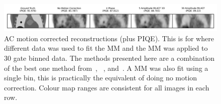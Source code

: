             \begin{figure}
                \centering
                
                \includegraphics[width=1.0\linewidth]{figures/motion_correction_2_results_2_best_visual_analysis.png}
                
                \captionsetup{singlelinecheck=false}
                \caption{
                    \gls{AC} motion corrected reconstructions (plus \gls{PIQE}). This is for where different data was used to fit the \gls{MM} and the \gls{MM} was applied to $30$ gate binned data. The methods presented here are a combination of the best one method from~, ~, and~. A \gls{MM} was also fit using a single bin, this is practically the equivalent of doing no motion correction. Colour map ranges are consistent for all images in each row.
                }
                
                \label{fig:evaluation_of_pet_ct_motion_correction_incorporating_motion_models_using_mlacf_and_complex_gating_schemes_results_best_visual_analysis}
            \end{figure}
            
